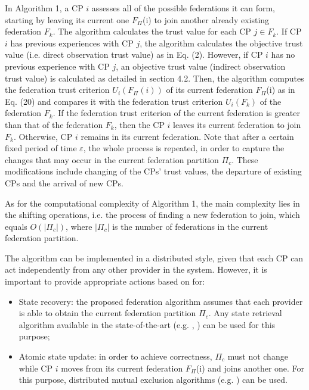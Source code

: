\documentclass[preprint]{elsarticle}
\theoremstyle{definition}
\theoremstyle{remark}
\theoremstyle{property}
\begin{document}
In Algorithm 1, a CP $i$ assesses all of the possible federations
it can form, starting by leaving its current one $F_{\Pi}$(i) to
join another already existing federation $F_{k}$. The algorithm
calculates the trust value for each CP $j \in F_{k}$. If CP $i$ has
previous experiences with CP $j$, the algorithm calculates
the objective trust value (i.e. direct observation trust value) as in Eq. (2). However, if CP $i$ has no previous
experience with CP $j$, an objective trust value (indirect
observation trust value) is calculated as detailed in section 4.2. Then, the algorithm computes the federation trust criterion $U_{i}(F_{\Pi}(i))$ of its current federation $F_{\Pi}$(i) as in Eq. (20) and compares it with the federation trust criterion $U_{i}(F_{k})$ of the federation $F_{k}$. If the federation trust criterion of the current federation is greater than that of the federation $F_{k}$, then the CP $i$ leaves its current federation to join $F_{k}$. Otherwise, CP $i$ remains in its current federation. Note that after a certain fixed period of time $\varepsilon$, the whole process is repeated, in order to capture the changes that may occur in the current federation partition $\Pi_{c}$. These modifications include changing of the CPs' trust values, the departure of existing CPs and the arrival of new CPs.

As for the computational complexity of Algorithm 1, the main
complexity lies in the shifting operations, i.e. the process of finding a new federation to join,
which equals $O(|\Pi_{c}|)$, where $|\Pi_{c}|$ is the number of federations in the current federation partition.

The algorithm can be implemented in a distributed
style, given that each CP can act independently from any other provider in the system.
However, it is important to provide appropriate actions
based on \cite{guazzone2014game} for:

\begin{itemize}

\item State recovery: the proposed federation algorithm assumes that each provider
is able to obtain the current federation partition $\Pi_{c}$. Any
state retrieval algorithm available in the state-of-the-art (e.g. \cite{sinha1998distributed}, \cite{wooldridge2009introduction})
can be used for this purpose;

\item Atomic state update: in order to achieve correctness, $\Pi_{c}$
must not change while CP $i$ moves from its current federation $F_{\Pi}$(i) and joins
another one. For this purpose, distributed mutual exclusion algorithms (e.g. \cite{kshemkalyani2011distributed})
can be used.


\end{itemize}
\end{document}
